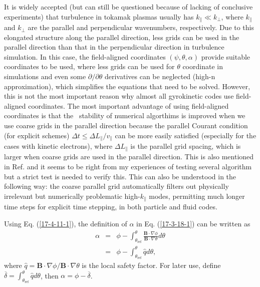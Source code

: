 \documentclass{article}
\newcommand{\tmop}[1]{\ensuremath{\operatorname{#1}}}
\begin{document}
It is widely accepted (but can still be questioned because of lacking of
conclusive experiments) that turbulence in tokamak plasmas usually has
$k_{\parallel} \ll k_{\perp}$, where $k_{\parallel}$ and $k_{\perp}$ are the
parallel and perpendicular wavenumbers, respectively. Due to this elongated
structure along the parallel direction, less grids can be used in the parallel
direction than that in the perpendicular direction in turbulence simulation.
In this case, the field-aligned coordinates $(\psi, \theta, \alpha)$ provide
suitable coordinates to be used, where less grids can be used for $\theta$
coordinate in simulations and even some $\partial / \partial \theta$
derivatives can be neglected (high-n approximation), which simplifies the
equations that need to be solved. However, this is not the most important
reason why almost all gyrokinetic codes use field-aligned coordinates. The
most important advantage of using field-aligned coordinates is that the \
stability of numerical algorthims is improved when we use coarse grids in the
parallel direction because the parallel Courant condition (for explicit
schemes) $\Delta t \leqslant \Delta L_{\parallel} / v_{\parallel}$ can be more
easily satisfied (especially for the cases with kinetic electrons), where
$\Delta L_{\parallel}$ is the parallel grid spacing, which is larger when
coarse grids are used in the parallel direction. This is also mentioned in
Ref. {\cite{ottaviani2011}} and it seems to be right from my experiences of
testing several algorithm but a strict test is needed to verify this. This can
also be understood in the following way: the coarse parallel grid
automatically filters out physically irrelevant but numerically problematic
high-$k_{\parallel}$ modes, permitting much longer time steps for explicit
time stepping, in both particle and fluid codes{\cite{dimits1993}}.

Using Eq. (\ref{17-4-11-1}), the definition of $\alpha$ in Eq.
(\ref{17-3-18-1}) can be written as
\begin{eqnarray}
  \alpha & = & \phi - \int_{\theta_{\tmop{ref}}}^{\theta} \frac{\mathbf{B}
  \cdot \nabla \phi}{\mathbf{B} \cdot \nabla \theta} d \theta 
  \label{17-9-15-1}\\
  & = & \phi - \int_{\theta_{\tmop{ref}}}^{\theta} \hat{q} d \theta, 
\end{eqnarray}
where $\hat{q} =\mathbf{B} \cdot \nabla \phi /\mathbf{B} \cdot \nabla \theta$
is the local safety factor. For later use, define $\overline{\delta} =
\int_{\theta_{\tmop{ref}}}^{\theta} \hat{q} d \theta$, then $\alpha = \phi -
\overline{\delta}$.
\end{document}
